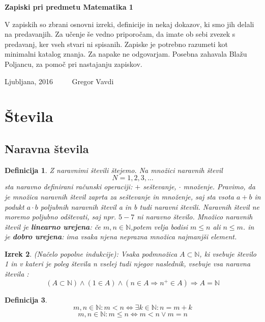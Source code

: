 \documentclass[11pt]{article}
\newtheorem{Izrek}{{\sc Izrek}}[section]
\newtheorem{Definicija}[Izrek]{{\sc Definicija}}
\begin{document}
	
	\thispagestyle{empty}
	\begin{center}
		\begin{Large}
			{\bf Zapiski pri predmetu Matematika 1}
		\end{Large}
		
	\end{center}
	V zapiskih so zbrani osnovni izreki, definicije in nekaj dokazov, ki smo jih delali na predavanjih. Za učenje še vedno priporočam, da imate ob sebi zvezek s predavanj, ker vseh stvari ni spisanih.
	Zapiske je potrebno razumeti kot minimalni katalog znanja.
	Za napake ne odgovarjam. Posebna zahavala Blažu Poljancu, za pomoč pri nastajanju zapiskov.
	\vfill
	\begin{center}
		Ljubljana, 2016 $\quad \quad $ Gregor Vavdi
	\end{center}
	\newpage
	\setcounter{page}{1}

\section{Števila}
\subsection{Naravna števila}


\begin{Definicija}
	Z naravnimi števili štejemo. Na množici naravnih števil
	$$N = {1, 2, 3, . . .}$$
	sta naravno definirani računski operaciji:
	\newline
	$+$ seštevanje,
	\newline
	$\cdot$ množenje.
	\newline
	Pravimo, da je množica naravnih števil zaprta za seštevanje in množenje, saj sta vsota $a+b$ in podukt $a\cdot b$ poljubnih naravnih števil a in b tudi naravni števili. Naravnih števil ne moremo poljubno odštevati, saj npr. $5 - 7$ ni naravno število.
 \newline
	Množico naravnih števil je  \textbf{linearno urejena}:
	če $m,n\in \mathbb{N}$,potem velja bodisi $m\le n$ ali $n \le m$.
	\newline
	in je \textbf{dobro urejena}: 
	ima vsaka njena neprazna množica najmanjši element.
\end{Definicija}
\begin{Izrek}
	(Načelo popolne indukcije): Vsaka podmnožica $A \subset \mathbb{N}$, ki vsebuje število 1 in v kateri je poleg števila n vselej tudi njegov naslednik, vsebuje vsa naravna števila :
	$$(A \subset \mathbb{N}) \wedge (1 \in A) \wedge (n\in A \Rightarrow n^+ \in A) \Rightarrow A = \mathbb{N}$$
\end{Izrek}
\begin{Definicija}
	$$m,n \in \mathbb{N}: m < n \iff \exists k \in \mathbb{N}: n = m + k$$
	$$m,n \in \mathbb{N}: m \le n \iff m < n \lor m = n$$
\end{Definicija}
\end{document}
